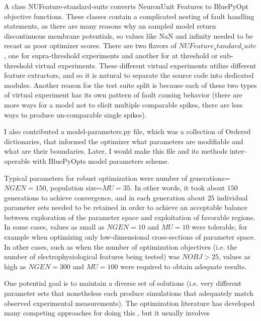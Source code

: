 
A class NUFeature-standard-suite converts NeuronUnit Features to BluePyOpt objective functions. These classes contain a complicated nesting of fault handling statements, as there are many reasons why an sampled model return discontinuous membrane potentials, so values like NaN and infinity needed to be recast as poor optimizer scores. There are two flavors of $NUFeature_standard_suite$, one for supra-threshold experiments and another for at threshold or sub-threshold virtual experiments. These different virtual experiments utilize different feature extractors, and so it is natural to separate the source code into dedicated modules. Another reason for the test suite split is because each of these two types of virtual experiment has its own pattern of fault causing behavior (there are more ways for a model not to elicit multiple comparable spikes, there are less ways to produce un-comparable single spikes).
 
I also contributed a model-parameters.py file, which was a collection of Ordered dictionaries, that informed the optimizer what parameters are modifiable and what are their boundaries. Later, I would make this file and its methods inter-operable with BluePyOpts model parameters scheme.


Typical parameters for robust optimization were number of generations=$NGEN=150$, population size=$MU=35$.
In other words, it took about $150$ generations to achieve convergence, and in each generation about $25$ individual parameter sets needed to be retained in order to achieve an acceptable balance between exploration of the parameter space and exploitation of favorable regions.
In some cases, values as small as $NGEN=10$ and $MU=10$ were tolerable, for example when optimizing only low-dimensional cross-sections of parameter space.
In other cases, such as when the number of optimization objectives (i.e. the number of electrophysiological features being tested) was $NOBJ>25$, values as high as $NGEN=300$ and $MU=100$ were required to obtain adequate results.

One potential goal is to maintain a diverse set of solutions (i.e. very different parameter sets that nonetheless each produce simulations that adequately match observed experimental measurements).
The optimization literature has developed many competing approaches for doing this \cite{deb2000fast}, but it usually involves  

